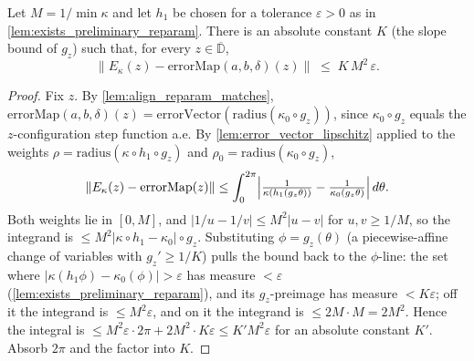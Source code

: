 \begin{lemma}


  \label{lem:kappa_error_map_close}
  Let $M = 1/\min\kappa$ and let $h_1$ be chosen for a tolerance $\varepsilon>0$
  as in \cref{lem:exists_preliminary_reparam}. There is an absolute constant
  $K$ (the slope bound of $g_z$) such that, for every $z\in\overline{\mathbb{D}}$,
  \[
    \bigl\lVert E_\kappa(z) - \mathrm{errorMap}(a,b,\delta)(z)\bigr\rVert
      \;\le\; K\,M^2\,\varepsilon .
  \]
\end{lemma}
\begin{proof}
        \leanok
  Fix $z$. By \cref{lem:align_reparam_matches},
  $\mathrm{errorMap}(a,b,\delta)(z) = \mathrm{errorVector}(\mathrm{radius}(\kappa_0\circ g_z))$,
  since $\kappa_0\circ g_z$ equals the $z$-configuration step function a.e.
  By \cref{lem:error_vector_lipschitz} applied to the
  weights $\rho = \mathrm{radius}(\kappa\circ h_1\circ g_z)$ and $\rho_0 =
  \mathrm{radius}(\kappa_0\circ g_z)$,
  \[
    \lVert E_\kappa(z) - \mathrm{errorMap}(z)\rVert
      \le \int_0^{2\pi}\Bigl\lvert \tfrac{1}{\kappa(h_1(g_z\theta))}
        - \tfrac{1}{\kappa_0(g_z\theta)}\Bigr\rvert\,d\theta .
  \]
  Both weights lie in $[0,M]$, and $\lvert 1/u-1/v\rvert\le M^2\lvert u-v\rvert$
  for $u,v\ge 1/M$, so the integrand is $\le M^2\lvert\kappa\circ h_1 - \kappa_0\rvert\circ g_z$.
  Substituting $\phi = g_z(\theta)$ (a piecewise-affine change of variables with
  $g_z'\ge 1/K$) pulls the bound back to the $\phi$-line: the set where
  $\lvert\kappa(h_1\phi)-\kappa_0(\phi)\rvert>\varepsilon$ has measure
  $<\varepsilon$ (\cref{lem:exists_preliminary_reparam}), and its $g_z$-preimage
  has measure $<K\varepsilon$; off it the integrand is $\le M^2\varepsilon$, and on
  it the integrand is $\le 2M\cdot M = 2M^2$. Hence the integral is
  $\le M^2\varepsilon\cdot 2\pi + 2M^2\cdot K\varepsilon \le K' M^2\varepsilon$ for
  an absolute constant $K'$. Absorb $2\pi$ and the factor into $K$.
\end{proof}

